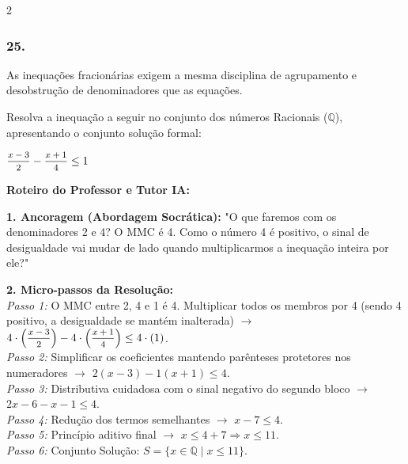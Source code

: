\begin{multicols*}{2}
\subsubsection*{25.} 
\begin{enunciadoLiteral}
As inequações fracionárias exigem a mesma disciplina de agrupamento e desobstrução de denominadores que as equações.

Resolva a inequação a seguir no conjunto dos números Racionais ($\mathbb{Q}$), apresentando o conjunto solução formal:

$ \mfrac{x - 3}{2} - \mfrac{x + 1}{4} \le 1 $
\end{enunciadoLiteral}

\ifgabarito
    \begin{tcolorbox}[colback=CorTitUm!5, colframe=CorTitUm, boxrule=1pt, arc=4pt, left=6pt, right=6pt, top=6pt, bottom=6pt]
    \small\textbf{\textcolor{CorTitUm}{Roteiro do Professor e Tutor IA:}}\par\vspace{0.1cm}
    \color{CinzaEscuro}
    \textbf{1. Ancoragem (Abordagem Socrática):} "O que faremos com os denominadores 2 e 4? O MMC é 4. Como o número 4 é positivo, o sinal de desigualdade vai mudar de lado quando multiplicarmos a inequação inteira por ele?"\par\vspace{0.1cm}
    
    \textbf{2. Micro-passos da Resolução:}\\
    \textit{Passo 1:} O MMC entre 2, 4 e 1 é 4. Multiplicar todos os membros por 4 (sendo 4 positivo, a desigualdade se mantém inalterada) $\rightarrow$ $4 \cdot \left(\mfrac{x - 3}{2}\right) - 4 \cdot \left(\mfrac{x + 1}{4}\right) \le 4 \cdot (1)$.\\
    \textit{Passo 2:} Simplificar os coeficientes mantendo parênteses protetores nos numeradores $\rightarrow$ $2(x - 3) - 1(x + 1) \le 4$.\\
    \textit{Passo 3:} Distributiva cuidadosa com o sinal negativo do segundo bloco $\rightarrow$ $2x - 6 - x - 1 \le 4$.\\
    \textit{Passo 4:} Redução dos termos semelhantes $\rightarrow$ $x - 7 \le 4$.\\
    \textit{Passo 5:} Princípio aditivo final $\rightarrow$ $x \le 4 + 7 \Rightarrow x \le 11$.\\
    \textit{Passo 6:} Conjunto Solução: $S = \{x \in \mathbb{Q} \mid x \le 11\}$.\par\vspace{0.1cm}
    

\end{tcolorbox}
\end{multicols*}
